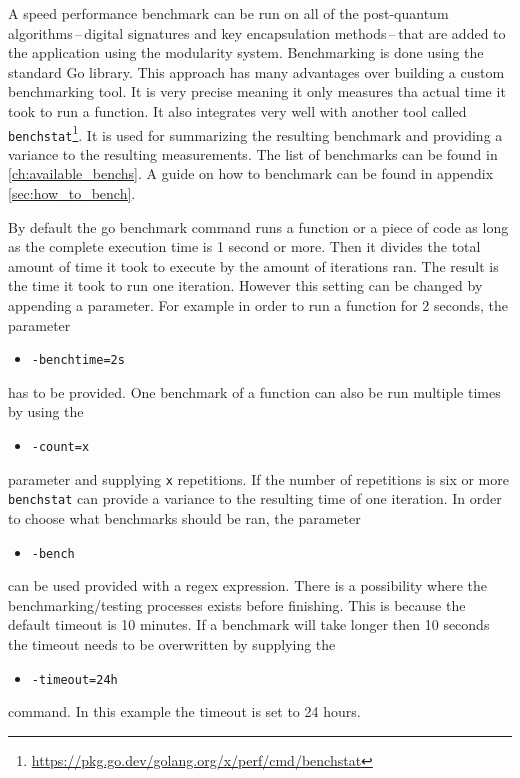 A speed performance benchmark can be run on all of the post-quantum algorithms\,--\,digital signatures and key encapsulation methods\,--\,that are added to the application using the modularity system. Benchmarking is done using the standard Go library. This approach has many advantages over building a custom benchmarking tool. It is very precise meaning it only measures tha actual time it took to run a function.
It also integrates very well with another tool called \texttt{benchstat}\footnote{\url{https://pkg.go.dev/golang.org/x/perf/cmd/benchstat}}. It is used for summarizing the resulting benchmark and providing a variance to the resulting measurements. The list of benchmarks can be found in \ref{ch:available_benchs}. A guide on how to benchmark can be found in appendix \ref{sec:how_to_bench}.

By default the go benchmark command runs a function or a piece of code as long as the complete execution time is 1 second or more. Then it divides the total amount of time it took to execute by the amount of iterations ran. The result is the time it took to run one iteration. However this setting can be changed by appending a parameter. For example in order to run a function for 2 seconds, the parameter
\begin{itemize}
  \item \texttt{-benchtime=2s}
\end{itemize}
has to be provided. One benchmark of a function can also be run multiple times by using the
\begin{itemize}
  \item \texttt{-count=x}
\end{itemize}
parameter and supplying \texttt{x} repetitions. If the number of repetitions is six or more \texttt{benchstat} can provide a variance to the resulting time of one iteration. In order to choose what benchmarks should be ran, the parameter
\begin{itemize}
  \item \texttt{-bench}
\end{itemize}
can be used provided with a regex expression. There is a possibility where the benchmarking/testing processes exists before finishing. This is because the default timeout is 10 minutes. If a benchmark will take longer then 10 seconds the timeout needs to be overwritten by supplying the
\begin{itemize}
  \item \texttt{-timeout=24h}
\end{itemize}
command. In this example the timeout is set to 24 hours.

